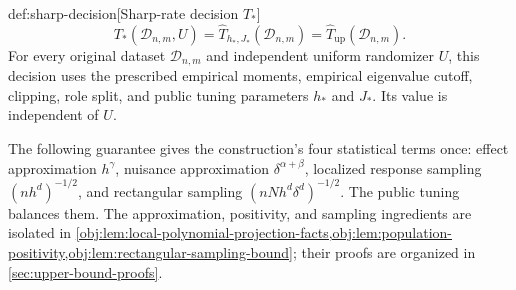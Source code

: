 \documentclass[11pt]{article}
\begin{document}
\begin{definitionv}{def:sharp-decision}[Sharp-rate decision \(T_*\)]
\[
T_*(\mathcal D_{n,m},U)
=\widehat T_{h_*,J_*}(\mathcal D_{n,m})
=\widehat T_{\mathrm{up}}(\mathcal D_{n,m}).
\]
For every original dataset \(\mathcal D_{n,m}\) and independent uniform randomizer \(U\), this decision uses the prescribed empirical moments, empirical eigenvalue cutoff, clipping, role split, and public tuning parameters \(h_*\) and \(J_*\). Its value is independent of \(U\).
\end{definitionv}

The following guarantee gives the construction's four statistical terms once: effect approximation \(h^\gamma\), nuisance approximation \(\delta^{\alpha+\beta}\), localized response sampling \((nh^d)^{-1/2}\), and rectangular sampling \((nNh^d\delta^d)^{-1/2}\). The public tuning balances them. The approximation, positivity, and sampling ingredients are isolated in \cref{obj:lem:local-polynomial-projection-facts,obj:lem:population-positivity,obj:lem:rectangular-sampling-bound}; their proofs are organized in \cref{sec:upper-bound-proofs}.
\end{document}
